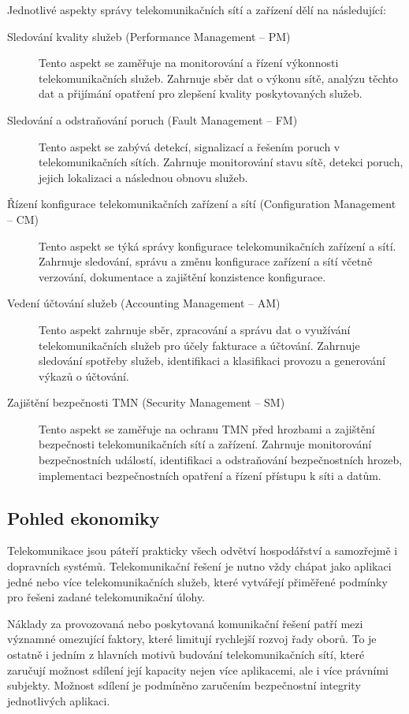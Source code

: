 Jednotlivé aspekty správy telekomunikačních sítí a zařízení dělí na následující:
\begin{description}
    \item[Sledování kvality služeb (Performance Management -- PM)] Tento aspekt se zaměřuje na monitorování a řízení výkonnosti telekomunikačních služeb. Zahrnuje sběr dat o výkonu sítě, analýzu těchto dat a přijímání opatření pro zlepšení kvality poskytovaných služeb.
    \item[Sledování a odstraňování poruch (Fault Management -- FM)] Tento aspekt se zabývá detekcí, signalizací a řešením poruch v telekomunikačních sítích. Zahrnuje monitorování stavu sítě, detekci poruch, jejich lokalizaci a následnou obnovu služeb.
    \item[Řízení konfigurace telekomunikačních zařízení a sítí (Configuration Management -- CM)] Tento aspekt se týká správy konfigurace telekomunikačních zařízení a sítí. Zahrnuje sledování, správu a změnu konfigurace zařízení a sítí včetně verzování, dokumentace a zajištění konzistence konfigurace.
    \item[Vedení účtování služeb (Accounting Management -- AM)] Tento aspekt zahrnuje sběr, zpracování a správu dat o využívání telekomunikačních služeb pro účely fakturace a účtování. Zahrnuje sledování spotřeby služeb, identifikaci a klasifikaci provozu a generování výkazů o účtování.
    \item[Zajištění bezpečnosti TMN (Security Management -- SM)] Tento aspekt se zaměřuje na ochranu TMN před hrozbami a zajištění bezpečnosti telekomunikačních sítí a zařízení. Zahrnuje monitorování bezpečnostních událostí, identifikaci a odstraňování bezpečnostních hrozeb, implementaci bezpečnostních opatření a řízení přístupu k síti a datům.
\end{description}

\subsection{Pohled ekonomiky}
Telekomunikace jsou páteří prakticky všech odvětví hospodářství a samozřejmě i dopravních systémů. Telekomunikační řešení je nutno vždy chápat jako aplikaci jedné nebo více telekomunikačních služeb, které vytvářejí přiměřené podmínky pro řešeni zadané telekomunikační úlohy.

Náklady za provozovaná nebo poskytovaná komunikační řešení patří mezi významné omezující faktory, které limitují rychlejší rozvoj řady oborů. To je ostatně i jedním z hlavních motivů budování telekomunikačních sítí, které zaručují možnost sdílení její kapacity nejen více aplikacemi, ale i více právními subjekty. Možnost sdílení je podmíněno zaručením bezpečnostní integrity jednotlivých aplikaci.


